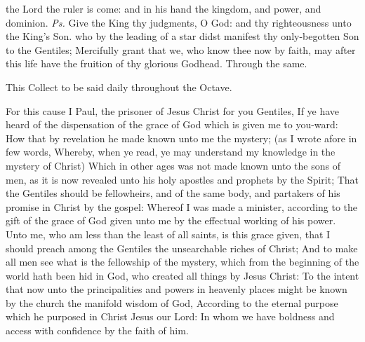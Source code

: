 \introit
{} the Lord the ruler is come: and in his hand the kingdom, and power, and dominion. \textit{Ps.} Give the King thy judgments, O God: and thy righteousness unto the King's Son.
\collect\label{EpiphanyMassCollect}
 who by the leading of a star didst manifest thy only-begotten Son to the Gentiles; Mercifully grant that we, who know thee now by faith, may after this life have the fruition of thy glorious Godhead. Through the same.
\begin{rubric}
    This Collect to be said daily throughout the Octave.
\end{rubric}
 For this cause I Paul, the prisoner of Jesus Christ for you Gentiles, If ye have heard of the dispensation of the grace of God which is given me to you-ward: How that by revelation he made known unto me the mystery; (as I wrote afore in few words, Whereby, when ye read, ye may understand my knowledge in the mystery of Christ) Which in other ages was not made known unto the sons of men, as it is now revealed unto his holy apostles and prophets by the Spirit; That the Gentiles should be fellowheirs, and of the same body, and partakers of his promise in Christ by the gospel: Whereof I was made a minister, according to the gift of the grace of God given unto me by the effectual working of his power. Unto me, who am less than the least of all saints, is this grace given, that I should preach among the Gentiles the unsearchable riches of Christ; And to make all men see what is the fellowship of the mystery, which from the beginning of the world hath been hid in God, who created all things by Jesus Christ: To the intent that now unto the principalities and powers in heavenly places might be known by the church the manifold wisdom of God, According to the eternal purpose which he purposed in Christ Jesus our Lord: In whom we have boldness and access with confidence by the faith of him.



